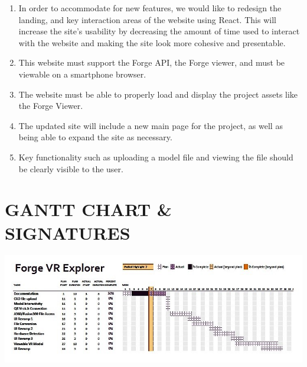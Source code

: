 \documentclass[letterpaper, 10pt, draftclsnofoot, compsoc, onecolumn]{IEEEtran}
\begin{document}
\begin{enumerate}
	\item In order to accommodate for new features, we would like to redesign the landing, and key interaction areas of the website using React. This will increase the site's usability by decreasing the amount of time used to interact with the website and making the site look more cohesive and presentable.

	\item This website must support the Forge API, the Forge viewer, and must be viewable on a smartphone browser. 

	\item The website must be able to properly load and display the project assets like the Forge Viewer. 
	\item The updated site will include a new main page for the project, as well as being able to expand the site as necessary.
	\item Key functionality such as uploading a model file and viewing the file should be clearly visible to the user.
		
\end{enumerate}

\clearpage
\section[GANTT CHART/SIGNATURES]{\rmfamily\bfseries\color{black}
GANTT CHART \& SIGNATURES}

\begin{center}
	\includegraphics[scale=0.8]{GanttChart.jpg}
\end{center}
\end{document}
